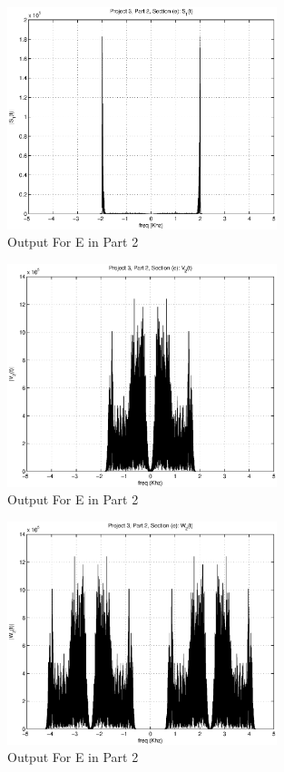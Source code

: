 \begin{figure}[!htbp]
  \centering
    \includegraphics[width=0.7\textwidth]{Part2/Output/Figures/Part2E-4.eps}
  \caption{Output For E in Part 2}
\end{figure}

\begin{figure}[!htbp]
  \centering
    \includegraphics[width=0.7\textwidth]{Part2/Output/Figures/Part2E-5.eps}
  \caption{Output For E in Part 2}
\end{figure}

\begin{figure}[!htbp]
  \centering
    \includegraphics[width=0.7\textwidth]{Part2/Output/Figures/Part2E-6.eps}
  \caption{Output For E in Part 2}
\end{figure}

